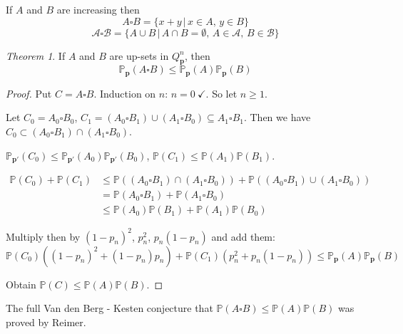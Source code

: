 \documentclass[a4paper]{article}
\theoremstyle{definition}
\theoremstyle{remark}
\theoremstyle{default}
\newtheorem{theorem}{Theorem}
\begin{document}
If $A$ and $B$ are increasing then
$$A \square B = \{ x+y \,|\, x \in A,\, y \in B\}$$
$$\mathcal{A} \square \mathcal{B} = \{A \cup B \,|\, A\cap B = \emptyset,\, A \in \mathcal{A},\, B \in \mathcal{B}\}$$

\begin{theorem}
	If $A$ and $B$ are up-sets in $Q^n_\mathbf{p}$, then
	$$\mathbb{P}_\mathbf{p}(A \square B) \leq \mathbb{P}_\mathbf{p}(A)\mathbb{P}_\mathbf{p}(B)$$
\end{theorem}
\begin{proof}
	Put $C = A \square B$. Induction on $n$: $n=0\ \checkmark$. So let $n \geq 1$.
	
	Let $C_0 = A_0 \square B_0$, $C_1 = (A_0 \square B_1) \cup (A_1 \square B_0) \subseteq A_1 \square B_1$.
	Then we have $C_0 \subset (A_0 \square B_1) \cap (A_1 \square B_0)$.
	
	$\mathbb{P}_\mathbf{p'}(C_0) \leq \mathbb{P}_\mathbf{p'}(A_0)\mathbb{P}_\mathbf{p'}(B_0)$,
	$\mathbb{P}(C_1) \leq \mathbb{P}(A_1)\mathbb{P}(B_1)$.
	
	\begin{align*}
		\mathbb{P}(C_0) + \mathbb{P}(C_1) & \leq \mathbb{P}((A_0 \square B_1) \cap (A_1 \square B_0)) + \mathbb{P}((A_0 \square B_1) \cup (A_1 \square B_0)) \\
		&= \mathbb{P}(A_0\square B_1) + \mathbb{P}(A_1 \square B_0) \\
		&\leq \mathbb{P}(A_0)\mathbb{P}(B_1) + \mathbb{P}(A_1)\mathbb{P}(B_0)
	\end{align*}
	
	Multiply then by $(1-p_n)^2$, $p_n^2$, $p_n(1-p_n)$ and add them:
	$$\mathbb{P}(C_0)((1-p_n)^2+(1-p_n)p_n) + \mathbb{P}(C_1)(p_n^2 + p_n(1-p_n)) \leq \mathbb{P}_\mathbf{p}(A)\mathbb{P}_\mathbf{p}(B)$$
	
	Obtain $\mathbb{P}(C) \leq \mathbb{P}(A) \mathbb{P}(B)$.
\end{proof}

The full Van den Berg - Kesten conjecture that $\mathbb{P}(A \square B) \leq \mathbb{P}(A)\mathbb{P}(B)$ was proved by Reimer.
\end{document}
